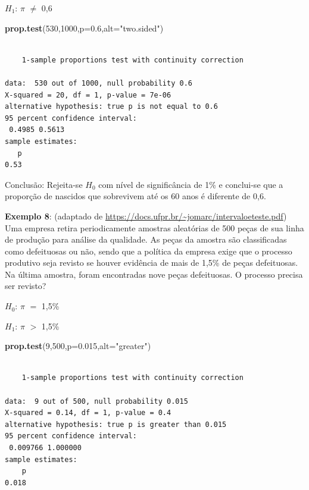 \documentclass[12pt,brazil,oneside]{book}
\newenvironment{Shaded}{\begin{snugshade}}{\end{snugshade}}
\newcommand{\DataTypeTok}[1]{\textcolor[rgb]{0.13,0.29,0.53}{#1}}
\newcommand{\DecValTok}[1]{\textcolor[rgb]{0.00,0.00,0.81}{#1}}
\newcommand{\FloatTok}[1]{\textcolor[rgb]{0.00,0.00,0.81}{#1}}
\newcommand{\KeywordTok}[1]{\textcolor[rgb]{0.13,0.29,0.53}{\textbf{#1}}}
\newcommand{\NormalTok}[1]{#1}
\newcommand{\StringTok}[1]{\textcolor[rgb]{0.31,0.60,0.02}{#1}}
\begin{document}
\textbf{\(H_1\)}: \(\pi\) \(\neq\) 0,6

\begin{Shaded}
\begin{Highlighting}[]
\KeywordTok{prop.test}\NormalTok{(}\DecValTok{530}\NormalTok{,}\DecValTok{1000}\NormalTok{,}\DataTypeTok{p=}\FloatTok{0.6}\NormalTok{,}\DataTypeTok{alt=}\StringTok{"two.sided"}\NormalTok{)}
\end{Highlighting}
\end{Shaded}

\begin{verbatim}

    1-sample proportions test with continuity correction

data:  530 out of 1000, null probability 0.6
X-squared = 20, df = 1, p-value = 7e-06
alternative hypothesis: true p is not equal to 0.6
95 percent confidence interval:
 0.4985 0.5613
sample estimates:
   p 
0.53 
\end{verbatim}

Conclusão: Rejeita-se \(H_0\) com nível de significância de 1\% e conclui-se que a proporção de nascidos que sobrevivem até os 60 anos é diferente de 0,6.

\textbf{Exemplo 8}: (adaptado de \url{https://docs.ufpr.br/~jomarc/intervaloeteste.pdf}) Uma empresa retira periodicamente amostras aleatórias de 500 peças de sua linha de produção para análise da qualidade. As peças da amostra são classificadas como defeituosas ou não, sendo que a política da empresa exige que o processo produtivo seja revisto se houver evidência de mais de 1,5\% de peças defeituosas. Na última amostra, foram encontradas nove peças defeituosas. O processo precisa ser revisto?

\textbf{\(H_0\)}: \(\pi\) \(=\) 1,5\%

\textbf{\(H_1\)}: \(\pi\) \(>\) 1,5\%

\begin{Shaded}
\begin{Highlighting}[]
\KeywordTok{prop.test}\NormalTok{(}\DecValTok{9}\NormalTok{,}\DecValTok{500}\NormalTok{,}\DataTypeTok{p=}\FloatTok{0.015}\NormalTok{,}\DataTypeTok{alt=}\StringTok{"greater"}\NormalTok{)}
\end{Highlighting}
\end{Shaded}

\begin{verbatim}

    1-sample proportions test with continuity correction

data:  9 out of 500, null probability 0.015
X-squared = 0.14, df = 1, p-value = 0.4
alternative hypothesis: true p is greater than 0.015
95 percent confidence interval:
 0.009766 1.000000
sample estimates:
    p 
0.018 
\end{verbatim}
\end{document}
